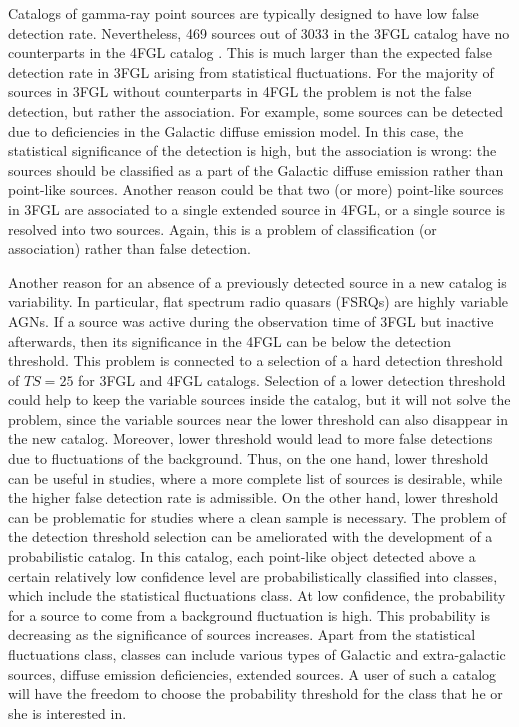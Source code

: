 Catalogs of gamma-ray point sources are typically designed to have low false detection rate. 
Nevertheless, 469 sources out of 3033 in the 3FGL catalog \citep{2015ApJS..218...23A} have no counterparts 
in the 4FGL catalog \citep{2020ApJS..247...33A}.
This is much larger than the expected false detection rate in 3FGL arising from statistical fluctuations.
For the majority of sources in 3FGL without counterparts in 4FGL the problem is not the false detection, 
but rather the association.
For example, some sources can be detected due to deficiencies in the Galactic diffuse emission model.
In this case, the statistical significance of the detection is high, but the association is wrong: the sources should be classified as
a part of the Galactic diffuse emission rather than point-like sources.
Another reason could be that two (or more) point-like sources in 3FGL are associated to a single extended source in 4FGL,
or a single source is resolved into two sources.
Again, this is a problem of classification (or association) rather than false detection.

Another reason for an absence of a previously detected source in a new catalog is variability.
In particular, flat spectrum radio quasars (FSRQs) are highly variable AGNs.
If a source was active during the observation time of 3FGL but inactive afterwards, 
then its significance in the 4FGL can be below the detection threshold.
This problem is connected to a selection of a hard detection threshold of $TS = 25$ for 3FGL and 4FGL catalogs.
Selection of a lower detection threshold could help to keep the variable sources inside the catalog, 
but it will not solve the problem, since the variable sources near the lower threshold can also disappear in the new catalog.
Moreover, lower threshold would lead to more false detections due to fluctuations of the background.
Thus, on the one hand, lower threshold can be useful in studies, where a more complete list of sources is desirable,
while the higher false detection rate is admissible. On the other hand, lower threshold can be problematic for studies where 
a clean sample is necessary. 
The problem of the detection threshold selection can be ameliorated with the development of a probabilistic catalog.
In this catalog, each point-like object detected above a certain relatively low confidence level
are probabilistically classified into classes, which include the statistical fluctuations class.
At low confidence, the probability for a source to come from a background fluctuation is high.
This probability is decreasing as the significance of sources increases.
Apart from the statistical fluctuations class, classes can include various types of Galactic and extra-galactic sources, diffuse emission deficiencies, extended sources.
A user of such a catalog will have the freedom to choose the probability threshold for the class that he or she is interested in.


